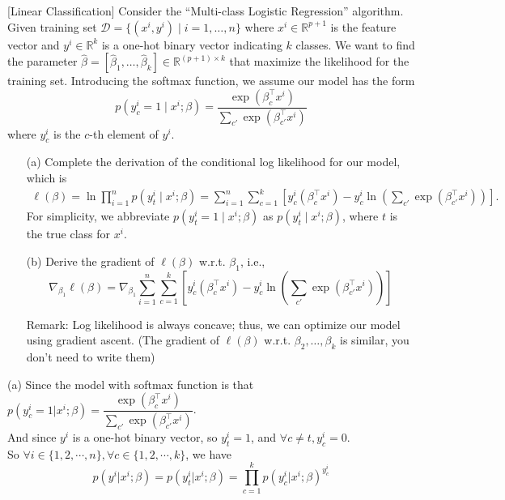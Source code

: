 \item {} [Linear Classification] Consider the ``Multi-class Logistic Regression'' algorithm. Given training set $\mathcal{D}=\{(x^i,y^i)\mid i=1,\ldots,n\}$ where $x^i\in \mathbb{R}^{p+1}$ is the feature vector and $y^i\in \mathbb{R}^{k}$ is a one-hot binary vector indicating $k$ classes. We want to find the parameter $\hat{\beta}=[\hat{\beta}_1,\ldots,\hat{\beta}_k]\in \mathbb{R}^{(p+1)\times k}$ that maximize the likelihood for the training set. Introducing the softmax function, we assume our model has the form
$$p(y_c^i=1\mid x^i;\beta) = \frac{\exp(\beta_c^\top x^i)}{\sum_{c'}\exp(\beta_{c'}^\top x^i)}$$
where $y_c^i$ is the $c$-th element of $y^i$.

\begin{itemize}
\item[(a)] Complete the derivation of the conditional log likelihood for our model, which is
\begin{align*}
    \ell(\beta) = \ln \prod_{i=1}^{n} p(y_t^i\mid x^i;\beta)
    =\sum_{i=1}^{n}\sum_{c=1}^{k}\left[ y_c^i(\beta_c^\top x^i) - y_c^i\ln \left(\sum_{c'}\exp(\beta_{c'}^\top x^i) \right)\right].
\end{align*}
For simplicity, we abbreviate $p(y_t^i=1\mid x^i;\beta)$ as $p(y_t^i\mid x^i;\beta)$, where $t$ is the true class for $x^i$.~
\item[(b)] Derive the gradient of $\ell(\beta)$ w.r.t. $\beta_1$, i.e.,
$$\nabla_{\beta_1}\ell(\beta) = \nabla_{\beta_1} \sum_{i=1}^{n}\sum_{c=1}^{k}\left[ y_c^i(\beta_c^\top x^i) - y_c^i\ln \left(\sum_{c'}\exp(\beta_{c'}^\top x^i) \right)\right]$$

Remark: Log likelihood is always concave; thus, we can optimize our model using gradient ascent. (The gradient of $\ell(\beta)$ w.r.t. $\beta_2,\ldots,\beta_k$ is similar, you don't need to write them)~
\end{itemize}

\solution

(a) Since the model with softmax function is that $p(y_c^i=1|x^i;\beta)=\dfrac{\exp(\beta_c^{\top}x^i)}{\sum\limits_{c'}\exp(\beta_{c'}^{\top}x^i)}$. \\
And since $y^i$ is a one-hot binary vector, so $y_t^i=1$, and $\forall c\neq t, y_{c}^i=0$. \\
So $\forall i\in\{1,2,\cdots,n\},\forall c\in\{1,2,\cdots,k\}$, we have
$$p(y^i|x^i;\beta)=p(y_t^i|x^i;\beta)=\prod\limits_{c=1}^k p(y_{c}^i|x^i;\beta)^{y_{c}^i}$$

